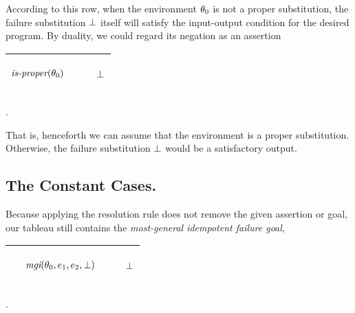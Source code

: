 \documentclass[runningheads]{llncs}
\DeclareMathOperator{\mgi}{\emph{mgi}}
\begin{document}
According to this row, when the environment  $\theta_{0}$ is not a proper substitution, the failure substitution $\bot$ itself will satisfy the input-output condition for the desired program.  By duality, we could regard its negation as an assertion


\begin{center}
\begin{tabular}{|m{}|m{}||m{}|} 
 \hline 
  \begin{center}
${\begin{aligned} 
&\begin{aligned}
\emph{is-proper}(\theta_{0})
  \end{aligned}\end{aligned}}$\hspace{2cm} 
\end{center} 
  & 
 & \begin{center}$\bot$ \end{center} \\
\hline
\end{tabular}.
\end{center}
That is, henceforth we can assume that the environment is a proper substitution. Otherwise, the failure substitution $\bot$ would be a satisfactory output.


\subsection{The Constant Cases.} Because applying the resolution rule does not remove the given assertion or goal, our tableau still contains the \emph{most-general idempotent failure goal},


\begin{center}
\begin{tabular}{T}
 \hline 
  & 
  \begin{center}
${\begin{aligned} 
&\begin{aligned}
  \,\, & {\mgi}(\thet{0}, \e{1}, \e{2}, \fail)
\end{aligned}\end{aligned}}$\hspace{1cm} 
\end{center} & \begin{center}$\bot$ \end{center} \\
\hline
\end{tabular}.
\end{center}
\end{document}
